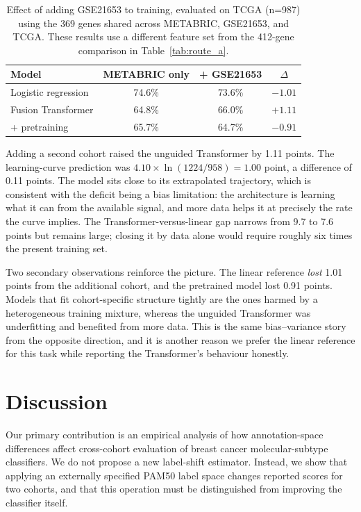 \documentclass[11pt,a4paper]{article}
\begin{document}
\begin{table}[H]
\centering
\caption{Effect of adding GSE21653 to training, evaluated on TCGA (n=987) using the 369 genes
shared across METABRIC, GSE21653, and TCGA. These results use a different feature set from the
412-gene comparison in Table~\ref{tab:route_a}.}
\label{tab:multicohort}
\begin{tabular}{lccc}
\toprule
\textbf{Model} & \textbf{METABRIC only} & \textbf{+ GSE21653} & \textbf{$\Delta$} \\
\midrule
Logistic regression & 74.6\% & 73.6\% & $-1.01$ \\
Fusion Transformer & 64.8\% & 66.0\% & $+1.11$ \\
\quad + pretraining & 65.7\% & 64.7\% & $-0.91$ \\
\bottomrule
\end{tabular}
\end{table}

Adding a second cohort raised the unguided Transformer by 1.11 points. The learning-curve
prediction was $4.10 \times \ln(1224/958) = 1.00$ point, a difference of 0.11 points. The
model sits close to its extrapolated trajectory, which is consistent with the deficit being a
bias limitation: the architecture is learning what it can from the available signal, and more
data helps it at precisely the rate the curve implies.
The Transformer-versus-linear gap narrows from 9.7 to 7.6 points but remains large; closing it
by data alone would require roughly six times the present training set.

Two secondary observations reinforce the picture. The linear reference \emph{lost} 1.01 points
from the additional cohort, and the pretrained model lost 0.91 points. Models that fit
cohort-specific structure tightly are the ones harmed by a heterogeneous training mixture,
whereas the unguided Transformer was underfitting and benefited from more data. This is the same
bias--variance story from the opposite direction, and it is another reason we prefer the linear
reference for this task while reporting the Transformer's behaviour honestly.

\section{Discussion}
\label{sec:discussion}

Our primary contribution is an empirical analysis of how annotation-space differences affect
cross-cohort evaluation of breast cancer molecular-subtype classifiers. We do not propose a new
label-shift estimator. Instead, we show that applying an externally specified PAM50 label space
changes reported scores for two cohorts, and that this operation must be distinguished from
improving the classifier itself.
\end{document}
